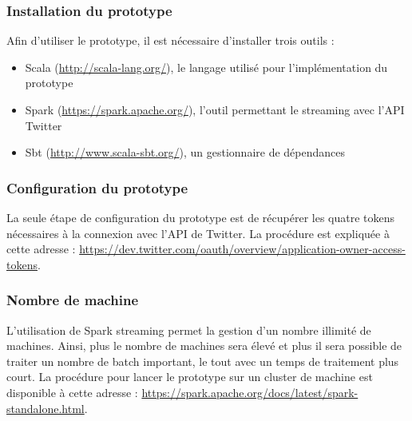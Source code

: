     \subsubsection{Installation du prototype}
      Afin d'utiliser le prototype, il est nécessaire d'installer trois outils :
      \begin{itemize}
        \item Scala (\url{http://scala-lang.org/}), le langage utilisé pour l'implémentation du prototype
        \item Spark (\url{https://spark.apache.org/}), l'outil permettant le streaming avec l'API Twitter
        \item Sbt (\url{http://www.scala-sbt.org/}), un gestionnaire de dépendances
      \end{itemize}

    \subsubsection{Configuration du prototype}
      La seule étape de configuration du prototype est de récupérer les quatre tokens nécessaires à la connexion avec l'API de Twitter. La procédure est expliquée à cette adresse : \url{https://dev.twitter.com/oauth/overview/application-owner-access-tokens}.

    \subsubsection{Nombre de machine}
      L'utilisation de Spark streaming permet la gestion d'un nombre illimité de machines. Ainsi, plus le nombre de machines sera élevé et plus il sera possible de traiter un nombre de batch important, le tout avec un temps de traitement plus court. La procédure pour lancer le prototype sur un cluster de machine est disponible à cette adresse : \url{https://spark.apache.org/docs/latest/spark-standalone.html}.
